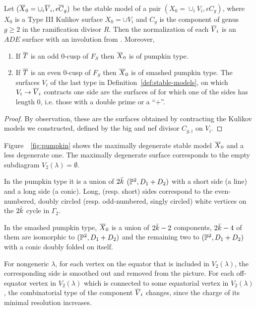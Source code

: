 \documentclass{amsart}
\begin{document}
\begin{theorem}\label{thm:stable-models}
  Let $({\overline X}_0 = \cup_i{\overline V}_i, \epsilon {\overline C}_g)$ be the stable model of a
  pair $(X_0=\cup_i V_i, \epsilon C_g)$, where $X_0$ is a Type III
  Kulikov surface $X_0 = \cup V_i$ and $C_g$ is the component of genus
  $g\ge2$ in the ramification divisor $R$. Then the normalization of
  each ${\overline V}_i$ is an $ADE$ surface with an involution from
  \cite[Table~2]{alexeev17ade-surfaces}. Moreover, 
  \begin{enumerate}
  \item If ${\overline T}$ is an odd $0$-cusp of $F_S$ then ${\overline X}_0$ is of pumpkin
    type.  
  \item If ${\overline T}$ is an even $0$-cusp of $F_S$ then ${\overline X}_0$ is of 
    smashed pumpkin type. The surfaces $V_i$ of the last type in
    Definition~\ref{def:stable-models}, on which $V_i\to{\overline V}_i$
    contracts one side are the surfaces of
    \cite[Table~2]{alexeev17ade-surfaces} for which one of the sides
    has length $0$, i.e. those with a double prime or a ``$+$''.
  \end{enumerate}
\end{theorem}
\begin{proof}
  By observation, these are the surfaces obtained by contracting the
  Kulikov models we constructed, defined by the big and nef divisor
  $C_{g,i}$ on $V_i$.  
\end{proof}

Figure~~\ref{fig:pumpkin}  %
shows the 
maximally degenerate stable model ${\overline X}_0$ and a less degenerate
one. The maximally degenerate surface corresponds to the empty
subdiagram $V_2(\lambda)=\emptyset$.

In the pumpkin type it is a union of $2\bar k$
$({\mathbb P}^2,D_1+D_2)$ with a short side (a line) and a long side (a
conic). Long, (resp. short) sides correspond to the even-numbered,
doubly circled (resp. odd-numbered, singly circled) white vertices on
the $2\bar k$ cycle in $\Gamma_2$.

In the smashed pumpkin type, ${\overline X}_0$ is a union of $2\bar k-2$
components, $2\bar k-4$ of them are isomorphic to $({\mathbb P}^2,D_1+D_2)$ and
the remaining two to $({\mathbb P}^2,D_1+D_2)$ with a conic doubly folded on
itself. 

For nongeneric $\lambda$, for each vertex on the equator that is
included in $V_2(\lambda)$, the corresponding side is smoothed out and
removed from the picture.
For each off-equator vertex in $V_2(\lambda)$ which is
connected to some equatorial vertex in $V_2(\lambda)$, the combinatorial
type of the component ${\overline V}_i$ changes, since the charge of its minimal
resolution increases.
\end{document}
